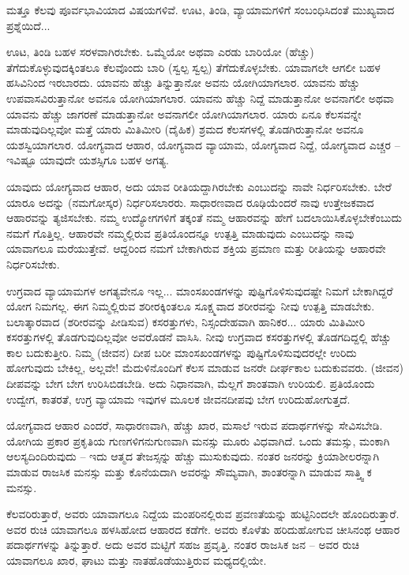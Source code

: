 ಮತ್ತೂ ಕೆಲವು ಪೂರ್ವಭಾವಿಯಾದ ವಿಷಯಗಳಿವೆ. ಊಟ, ತಿಂಡಿ, ವ್ಯಾಯಾಮಗಳಿಗೆ ಸಂಬಂಧಿಸಿದಂತೆ ಮುಖ್ಯವಾದ ಪ್ರಶ್ನೆಯಿದೆ...

ಊಟ, ತಿಂಡಿ ಬಹಳ ಸರಳವಾಗಿರಬೇಕು. ಒಮ್ಮೆಯೋ ಅಥವಾ ಎರಡು ಬಾರಿಯೋ (ಹೆಚ್ಚು) ತೆಗೆದುಕೊಳ್ಳುವುದಕ್ಕಿಂತಲೂ ಕೆಲವೊಂದು ಬಾರಿ (ಸ್ವಲ್ಪ ಸ್ವಲ್ಪ) ತೆಗೆದುಕೊಳ್ಳಬೇಕು. ಯಾವಾಗಲೇ ಆಗಲೀ ಬಹಳ ಹಸಿವಿನಿಂದ ಇರಬಾರದು. ಯಾವನು ಹೆಚ್ಚು ತಿನ್ನುತ್ತಾನೋ ಅವನು ಯೋಗಿಯಾಗಲಾರ. ಯಾವನು ಹೆಚ್ಚು ಉಪವಾಸವಿರುತ್ತಾನೋ ಅವನೂ ಯೋಗಿಯಾಗಲಾರ. ಯಾವನು ಹೆಚ್ಚು ನಿದ್ದೆ ಮಾಡುತ್ತಾನೋ ಅವನಾಗಲೀ ಅಥವಾ ಯಾವನು ಹೆಚ್ಚು ಜಾಗರಣೆ ಮಾಡುತ್ತಾನೋ ಅವನಾಗಲೀ ಯೋಗಿಯಾಗಲಾರ. ಯಾರು ಏನೂ ಕೆಲಸವನ್ನೇ ಮಾಡುವುದಿಲ್ಲವೋ ಮತ್ತೆ ಯಾರು ಮಿತಿಮೀರಿ (ದೈಹಿಕ) ಶ್ರಮದ ಕೆಲಸಗಳಲ್ಲಿ ತೊಡಗಿರುತ್ತಾನೋ ಅವನೂ ಯಶಸ್ವಿಯಾಗಲಾರ. ಯೋಗ್ಯವಾದ ಆಹಾರ, ಯೋಗ್ಯವಾದ ವ್ಯಾಯಾಮ, ಯೋಗ್ಯವಾದ ನಿದ್ದೆ, ಯೋಗ್ಯವಾದ ಎಚ್ಚರ – ಇವಿಷ್ಟೂ ಯಾವುದೇ ಯಶಸ್ಸಿಗೂ ಬಹಳ ಅಗತ್ಯ.

ಯಾವುದು ಯೋಗ್ಯವಾದ ಆಹಾರ, ಅದು ಯಾವ ರೀತಿಯದ್ದಾಗಿರಬೇಕು ಎಂಬುದನ್ನು ನಾವೇ ನಿರ್ಧರಿಸಬೇಕು. ಬೇರೆ ಯಾರೂ ಅದನ್ನು (ನಮಗೋಸ್ಕರ) ನಿರ್ಧರಿಸಲಾರರು. ಸಾಧಾರಣವಾದ ರೂಢಿಯೆಂದರೆ ನಾವು ಉತ್ತೇಜಕವಾದ ಆಹಾರವನ್ನು ತ್ಯಜಿಸಬೇಕು. ನಮ್ಮ ಉದ್ಯೋಗಗಳಿಗೆ ತಕ್ಕಂತೆ ನಮ್ಮ ಆಹಾರವನ್ನು ಹೇಗೆ ಬದಲಾಯಿಸಿಕೊಳ್ಳಬೇಕೆಂಬುದು ನಮಗೆ ಗೊತ್ತಿಲ್ಲ. ಆಹಾರವೇ ನಮ್ಮಲ್ಲಿರುವ ಪ್ರತಿಯೊಂದನ್ನೂ ಉತ್ಪತ್ತಿ ಮಾಡುವುದು ಎಂಬುದನ್ನು ನಾವು ಯಾವಾಗಲೂ ಮರೆಯುತ್ತೇವೆ. ಆದ್ದರಿಂದ ನಮಗೆ ಬೇಕಾಗಿರುವ ಶಕ್ತಿಯ ಪ್ರಮಾಣ ಮತ್ತು ರೀತಿಯನ್ನು ಆಹಾರವೇ ನಿರ್ಧರಿಸಬೇಕು.

ಉಗ್ರವಾದ ವ್ಯಾಯಾಮಗಳ ಅಗತ್ಯವೇನೂ ಇಲ್ಲ... ಮಾಂಸಖಂಡಗಳನ್ನು ಪುಷ್ಟಿಗೊಳಿಸುವುದಷ್ಟೇ ನಿಮಗೆ ಬೇಕಾಗಿದ್ದರೆ ಯೋಗ ನಿಮಗಲ್ಲ. ಈಗ ನಿಮ್ಮಲ್ಲಿರುವ ಶರೀರಕ್ಕಿಂತಲೂ ಸೂಕ್ಷ್ಮವಾದ ಶರೀರವನ್ನು ನೀವು ಉತ್ಪತ್ತಿ ಮಾಡಬೇಕು. ಬಲಾತ್ಕಾರವಾದ (ಶರೀರವನ್ನು ಪೀಡಿಸುವ) ಕಸರತ್ತುಗಳು, ನಿಸ್ಸಂದೇಹವಾಗಿ ಹಾನಿಕರ... ಯಾರು ಮಿತಿಮೀರಿ ಕಸರತ್ತುಗಳಲ್ಲಿ ತೊಡಗುವುದಿಲ್ಲವೋ ಅವರೊಡನೆ ವಾಸಿಸಿ. ನೀವು ಉಗ್ರವಾದ ಕಸರತ್ತುಗಳಲ್ಲಿ ತೊಡಗದಿದ್ದಲ್ಲಿ ಹೆಚ್ಚು ಕಾಲ ಬದುಕುತ್ತೀರಿ. ನಿಮ್ಮ (ಜೀವನ) ದೀಪ ಬರೀ ಮಾಂಸಖಂಡಗಳನ್ನು ಪುಷ್ಟಿಗೊಳಿಸುವುದರಲ್ಲೇ ಉರಿದು ಹೋಗುವುದು ಬೇಕಿಲ್ಲ, ಅಲ್ಲವೇ! ಮೆದುಳಿನೊಂದಿಗೆ ಕೆಲಸ ಮಾಡುವ ಜನರೇ ದೀರ್ಘಕಾಲ ಬದುಕುವವರು. (ಜೀವನ) ದೀಪವನ್ನು ಬೇಗ ಬೇಗ ಉರಿಸಿಬಿಡಬೇಡಿ. ಅದು ನಿಧಾನವಾಗಿ, ಮೆಲ್ಲಗೆ ಶಾಂತವಾಗಿ ಉರಿಯಲಿ. ಪ್ರತಿಯೊಂದು ಉದ್ವೇಗ, ಕಾತರತೆ, ಉಗ್ರ ವ್ಯಾಯಾಮ ಇವುಗಳ ಮೂಲಕ ಜೀವನದೀಪವು ಬೇಗ ಉರಿದುಹೋಗುತ್ತದೆ.

ಯೋಗ್ಯವಾದ ಆಹಾರ ಎಂದರೆ, ಸಾಧಾರಣವಾಗಿ, ಹೆಚ್ಚು ಖಾರ, ಮಸಾಲೆ ಇರುವ ಪದಾರ್ಥಗಳನ್ನು ಸೇವಿಸಬೇಡಿ. ಯೋಗಿಯ ಪ್ರಕಾರ ಪ್ರಕೃತಿಯ ಗುಣಗಳಿಗನುಗುಣವಾಗಿ ಮನಸ್ಸು ಮೂರು ವಿಧವಾಗಿದೆ. ಒಂದು ತಮಸ್ಸು, ಮಂಕಾಗಿ ಆಲಸ್ಯದಿಂದಿರುವುದು – ಇದು ಆತ್ಮದ ತೇಜಸ್ಸನ್ನು ಹೆಚ್ಚು ಮುಸುಕುವುದು. ನಂತರ ಜನರನ್ನು ಕ್ರಿಯಾಶೀಲರನ್ನಾಗಿ ಮಾಡುವ ರಾಜಸಿಕ ಮನಸ್ಸು ಮತ್ತು ಕೊನೆಯದಾಗಿ ಅವರನ್ನು ಸೌಮ್ಯವಾಗಿ, ಶಾಂತರನ್ನಾಗಿ ಮಾಡುವ ಸಾತ್ತ್ವಿ ಕ ಮನಸ್ಸು.

ಕೆಲವರಿರುತ್ತಾರೆ, ಅವರು ಯಾವಾಗಲೂ ನಿದ್ದೆಯ ಮಂಪರಿನಲ್ಲಿರುವ ಪ್ರವಣತೆಯನ್ನು ಹುಟ್ಟಿನಿಂದಲೇ ಹೊಂದಿರುತ್ತಾರೆ. ಅವರ ರುಚಿ ಯಾವಾಗಲೂ ಹಳಸಿಹೋದ ಆಹಾರದ ಕಡೆಗೇ. ಅವರು ಕೊಳೆತು ಹರಿದುಹೋಗುವ ಚೀಸಿನಂಥ ಆಹಾರ ಪದಾರ್ಥಗಳನ್ನು ತಿನ್ನುತ್ತಾರೆ. ಅದು ಅವರ ಮಟ್ಟಿಗೆ ಸಹಜ ಪ್ರವೃತ್ತಿ. ನಂತರ ರಾಜಸಿಕ ಜನ – ಅವರ ರುಚಿ ಯಾವಾಗಲೂ ಖಾರ, ಘಾಟು ಮತ್ತು ನಾತಹೊಡೆಯುತ್ತಿರುವ ಮಧ್ಯದಲ್ಲಿಯೇ.


